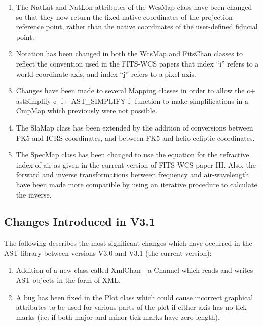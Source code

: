 \documentclass[twoside,11pt]{article}
\begin{document}
\begin{enumerate}
\item The NatLat and NatLon attributes of the WcsMap class have been
changed so that they now return the fixed native coordinates of the
projection reference point, rather than the native coordinates of the
user-defined fiducial point. 

\item Notation has been changed in both the WcsMap and FitsChan classes to 
reflect the convention used in the FITS-WCS papers that index ``i'' refers
to a world coordinate axis, and index ``j'' refers to a pixel axis.

\item Changes have been made to several Mapping classes in order to allow
the 
c+
astSimplify
c-
f+
AST\_SIMPLIFY
f-
function to make simplifications in a CmpMap which previously were not
possible.

\item The SlaMap class has been extended by the addition of conversions
between FK5 and ICRS coordinates, and between FK5 and helio-ecliptic coordinates.

\item The SpecMap class has been changed to use the equation for the
refractive index of air as given in the current version of FITS-WCS paper
III. Also, the forward and inverse transformations between frequency and
air-wavelength have been made more compatible by using an iterative
procedure to calculate the inverse.

\end{enumerate}

\subsection{Changes Introduced in V3.1}

The following describes the most significant changes which have
occurred in the AST library between versions V3.0 and V3.1 (the
current version):

\begin{enumerate}
\item Addition of a new class called XmlChan - a Channel which 
reads and writes AST objects in the form of XML.
\item A bug has been fixed in the Plot class which could cause incorrect
graphical attributes to be used for various parts of the plot if either
axis has no tick marks (i.e. if both major and minor tick marks have zero
length).
\end{enumerate}
\end{document}
